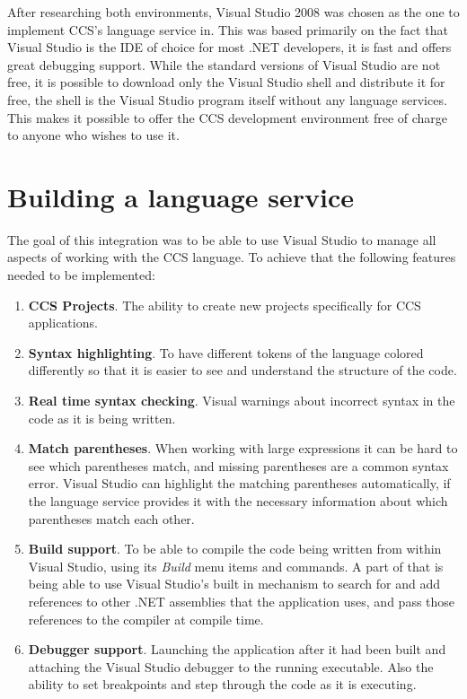 	After researching both environments, Visual Studio 2008 was chosen as the one
	to implement CCS's language service in. This was based primarily on the fact
	that Visual Studio is the IDE of choice for most .NET developers, it is fast 
	and offers great debugging support. While the standard versions of Visual 
	Studio are not free, it is possible to download only the Visual Studio shell 
	and distribute it for free, the shell is the Visual Studio program itself 
	without any language services. This makes it possible to offer the CCS 
	development environment free of charge to anyone who wishes to use it.
	
\section{Building a language service}
	
	The goal of this integration was to be able to use Visual Studio to manage 
	all aspects of working with the CCS language. To achieve that the following 
	features needed to be implemented:
	
	\begin{enumerate}
		\item \textbf{CCS Projects}. The ability to create new projects 
		specifically for CCS applications.

		\item \textbf{Syntax highlighting}. To have different tokens of the 
		language colored differently so that it is easier to see and understand 
		the structure of the code.
		
		\item \textbf{Real time syntax checking}. Visual warnings about 
		incorrect syntax in the code as it is being written. 
	
		\item \textbf{Match parentheses}. When working with large expressions it 
		can be hard to see which parentheses match, and missing parentheses are a 
		common syntax error. Visual Studio can highlight the matching parentheses 
		automatically, if the language service provides it with the necessary 
		information about which parentheses match each other.
		
		\item \textbf{Build support}. To be able to compile the code being written 
		from within Visual Studio, using its \textit{Build} menu items and 
		commands. A part of that is being able to use Visual Studio's built in 
		mechanism to search for and add references to other .NET assemblies that 
		the application uses, and pass those references to the compiler at compile 
		time.
		
		\item \textbf{Debugger support}. Launching the application after it had 
		been built and attaching the Visual Studio debugger to the running 
		executable. Also the ability to set breakpoints and step through the code 
		as it is executing.
		
	\end{enumerate}
	
